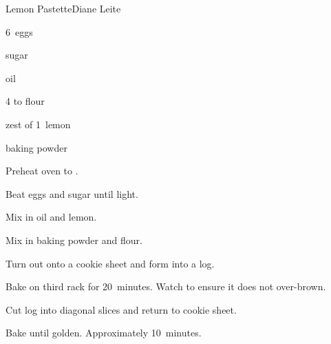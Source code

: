 \begin{recipe}{Lemon Pastette}{Diane Leite}{}

\begin{ingredients}
\item 6~eggs
\item \C{1\half} sugar
\item \C{\threequarter} oil
\item 4 to  flour
\item zest of 1~lemon
\item {} baking powder
\end{ingredients}

\begin{directions}
\item Preheat oven to .
\item Beat eggs and sugar until light.
\item Mix in oil and lemon.
\item Mix in baking powder and flour.
\item Turn out onto a cookie sheet and form into a log.
\item Bake on third rack for 20~minutes. Watch to ensure it does not over-brown.
\item Cut log into diagonal slices and return to cookie sheet.
\item Bake until golden. Approximately 10~minutes.
\end{directions}

\end{recipe}
